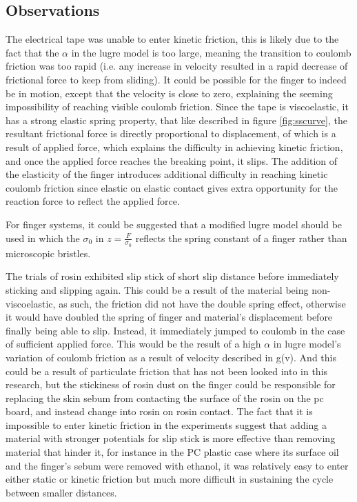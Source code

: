 \documentclass[12pt]{article}
\begin{document}
\subsection{Observations}
The electrical tape was unable to enter kinetic friction, this is likely due to the fact that the $\alpha$ in the lugre model is too large, meaning the transition to coulomb friction was too rapid (i.e. any increase in velocity resulted in a rapid decrease of frictional force to keep from sliding). It could be possible for the finger to indeed be in motion, except that the velocity is close to zero, explaining the seeming impossibility of reaching visible coulomb friction. Since the tape is viscoelastic, it has a strong elastic spring property, that like described in figure \ref{fig:sscurve}, the resultant frictional force is directly proportional to displacement, of which is a result of applied force, which explains the difficulty in achieving kinetic friction, and once the applied force reaches the breaking point, it slips. The addition of the elasticity of the finger introduces additional difficulty in reaching kinetic coulomb friction since elastic on elastic contact gives extra opportunity for the reaction force to reflect the applied force.

For finger systems, it could be suggested that a modified lugre model should be used in which the $\sigma_{0}$ in $z=\frac{F}{\sigma_{0}}$ reflects the spring constant of a finger rather than microscopic bristles.

The trials of rosin exhibited slip stick of short slip distance before immediately sticking and slipping again. This could be a result of the material being non-viscoelastic, as such, the friction did not have the double spring effect, otherwise it would have doubled the spring of finger and material's displacement before finally being able to slip. Instead, it immediately jumped to coulomb in the case of sufficient applied force. This would be the result of a high $\alpha$ in lugre model's variation of coulomb friction as a result of velocity described in g(v). And this could be a result of particulate friction that has not been looked into in this research, but the stickiness of rosin dust on the finger could be responsible for replacing the skin sebum from contacting the surface of the rosin on the pc board, and instead change into rosin on rosin contact. The fact that it is impossible to enter kinetic friction in the experiments suggest that adding a material with stronger potentials for slip stick is more effective than removing material that hinder it, for instance in the PC plastic case where its surface oil and the finger's sebum were removed with ethanol, it was relatively easy to enter either static or kinetic friction but much more difficult in sustaining the cycle between smaller distances.
\end{document}
